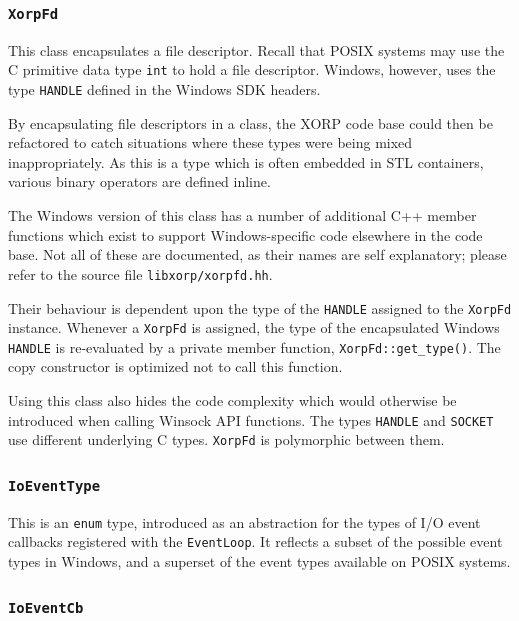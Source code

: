 \documentclass[11pt]{article}
\begin{document}
\subsubsection{{\tt XorpFd}}

This class encapsulates a file descriptor. Recall that POSIX systems
may use the C primitive data type {\tt int} to hold a file descriptor.
Windows, however, uses the type {\tt HANDLE} defined in the Windows
SDK headers.

By encapsulating file descriptors in a class, the XORP code base
could then be refactored to catch situations where these types were
being mixed inappropriately. As this is a type which is often embedded
in STL containers, various binary operators are defined inline.

The Windows version of this class has a number of additional C++ member
functions which exist to support Windows-specific code elsewhere in the
code base. Not all of these are documented, as their names are self
explanatory; please refer to the source file {\tt libxorp/xorpfd.hh}.

Their behaviour is dependent upon the type of the {\tt HANDLE} assigned
to the {\tt XorpFd} instance. Whenever a {\tt XorpFd} is assigned, the
type of the encapsulated Windows {\tt HANDLE} is re-evaluated by a
private member function, {\tt XorpFd::get\_type()}. The copy
constructor is optimized not to call this function.

Using this class also hides the code complexity which would otherwise
be introduced when calling Winsock API functions.
The types {\tt HANDLE} and {\tt SOCKET} use different underlying C types.
{\tt XorpFd} is polymorphic between them.

\subsubsection{{\tt IoEventType}}

This is an {\tt enum} type, introduced as an abstraction for
the types of I/O event callbacks registered with the
{\tt EventLoop}. It reflects a subset of the possible
event types in Windows, and a superset of the event types
available on POSIX systems.

\subsubsection{{\tt IoEventCb}}
\end{document}
